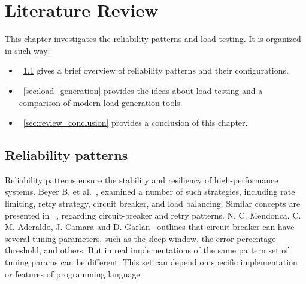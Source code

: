 \chapter{Literature Review}
\label{ch:lr}

This chapter investigates the reliability patterns and load testing.
It is organized in such way:
\begin{itemize}
    \item~\ref{sec:reliability} gives a brief overview of reliability patterns and their configurations.
    \item~\ref{sec:load_generation} provides the ideas about load testing and a comparison of modern load generation tools.
    \item~\ref{sec:review_conclusion} provides a conclusion of this chapter.
\end{itemize}


\section{Reliability patterns}\label{sec:reliability}
Reliability patterns ensure the stability and resiliency of high-performance systems.
Beyer B. et al.~\cite{google_sre}, examined a number of such strategies, including rate limiting, retry strategy, circuit breaker, and load balancing. Similar concepts are presented in ~\cite{reliability_patterns}, regarding circuit-breaker and retry patterns.
N. C. Mendonca, C. M. Aderaldo, J. Camara and D. Garlan~\cite{circuit_breaker} outlines that circuit-breaker can have several tuning parameters, such as the sleep window, the error percentage threshold, and others. But in real implementations of the same pattern set of tuning params can be different. This set can depend on specific implementation or features of programming language.

